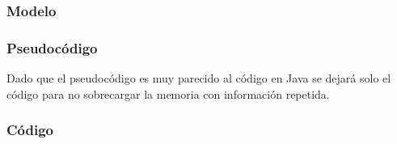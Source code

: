 \documentclass[11pt,a4paper]{article}
\begin{document}
\subsubsection{Modelo}


\begin{figure}[H]
\end{figure}

\subsubsection{Pseudocódigo}

Dado que el pseudocódigo es muy parecido al código en Java se dejará solo el código para no sobrecargar la memoria con información repetida.

\subsubsection{Código}








\end{document}
